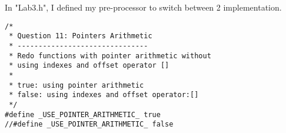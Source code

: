 \documentclass{article}
\begin{document}
In "Lab3.h", I defined my pre-processor to switch between 2 implementation.

\begin{lstlisting}[label=lab3.11,caption=Pointer Arithmetic]
/*
 * Question 11: Pointers Arithmetic
 * -------------------------------
 * Redo functions with pointer arithmetic without
 * using indexes and offset operator []
 *
 * true: using pointer arithmetic
 * false: using indexes and offset operator:[]
 */
#define _USE_POINTER_ARITHMETIC_ true
//#define _USE_POINTER_ARITHMETIC_ false
\end{lstlisting}	
\end{document}
